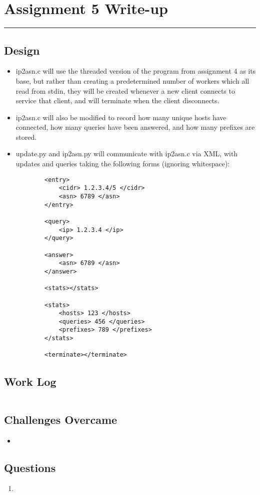 \documentclass[letterpaper,10pt,fleqn]{article}
\numberwithin{equation}{section}
\begin{document}

\section*{Assignment 5 Write-up}
\hrule

\subsection*{Design}
\begin{itemize}
    \item ip2asn.c will use the threaded version of the program from assignment 4 as its base, but rather than creating a predetermined number of workers which all read from stdin, they will be created whenever a new client connects to service that client, and will terminate when the client disconnects.
    \item ip2asn.c will also be modified to record how many unique hosts have connected, how many queries have been answered, and how many prefixes are stored.
    \item update.py and ip2asn.py will communicate with ip2asn.c via XML, with updates and queries taking the following forms (ignoring whitespace):
    \begin{verbatim}
        <entry>
            <cidr> 1.2.3.4/5 </cidr>
            <asn> 6789 </asn>
        </entry>

        <query>
            <ip> 1.2.3.4 </ip>
        </query>

        <answer>
            <asn> 6789 </asn>
        </answer>

        <stats></stats>

        <stats>
            <hosts> 123 </hosts>
            <queries> 456 </queries>
            <prefixes> 789 </prefixes>
        </stats>

        <terminate></terminate>
    \end{verbatim}
\end{itemize}

\subsection*{Work Log}
\begin{verbatim}
\end{verbatim}
\subsection*{Challenges Overcame}
\begin{itemize}
    \item
\end{itemize}

\subsection*{Questions}
\begin{enumerate}
    \item
\end{enumerate}
\end{document}
